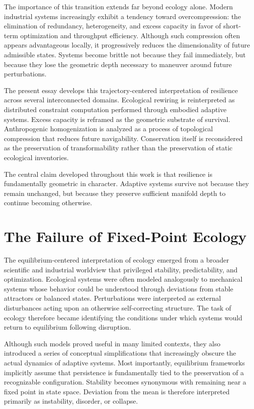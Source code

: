 \documentclass[11pt,a4paper]{article}
\begin{document}
The importance of this transition extends far beyond ecology alone. Modern industrial systems increasingly exhibit a tendency toward overcompression: the elimination of redundancy, heterogeneity, and excess capacity in favor of short-term optimization and throughput efficiency. Although such compression often appears advantageous locally, it progressively reduces the dimensionality of future admissible states. Systems become brittle not because they fail immediately, but because they lose the geometric depth necessary to maneuver around future perturbations.

The present essay develops this trajectory-centered interpretation of resilience across several interconnected domains. Ecological rewiring is reinterpreted as distributed constraint computation performed through embodied adaptive systems. Excess capacity is reframed as the geometric substrate of survival. Anthropogenic homogenization is analyzed as a process of topological compression that reduces future navigability. Conservation itself is reconsidered as the preservation of transformability rather than the preservation of static ecological inventories.

The central claim developed throughout this work is that resilience is fundamentally geometric in character. Adaptive systems survive not because they remain unchanged, but because they preserve sufficient manifold depth to continue becoming otherwise.

\newpage

\section{The Failure of Fixed-Point Ecology}

The equilibrium-centered interpretation of ecology emerged from a broader scientific and industrial worldview that privileged stability, predictability, and optimization. Ecological systems were often modeled analogously to mechanical systems whose behavior could be understood through deviations from stable attractors or balanced states. Perturbations were interpreted as external disturbances acting upon an otherwise self-correcting structure. The task of ecology therefore became identifying the conditions under which systems would return to equilibrium following disruption.

Although such models proved useful in many limited contexts, they also introduced a series of conceptual simplifications that increasingly obscure the actual dynamics of adaptive systems. Most importantly, equilibrium frameworks implicitly assume that persistence is fundamentally tied to the preservation of a recognizable configuration. Stability becomes synonymous with remaining near a fixed point in state space. Deviation from the mean is therefore interpreted primarily as instability, disorder, or collapse.
\end{document}

